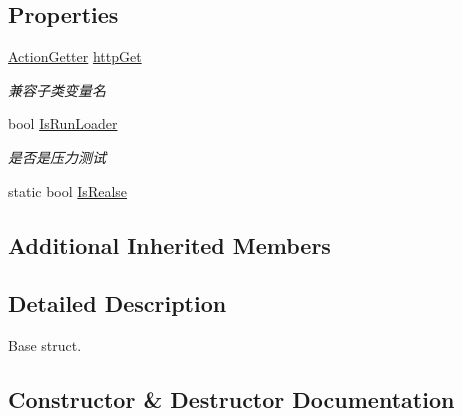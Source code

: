 \subsection*{Properties}
\begin{DoxyCompactItemize}
\item 
\mbox{\hyperlink{class_t_net_1_1_service_1_1_action_getter}{Action\+Getter}} \mbox{\hyperlink{class_t_net_1_1_service_1_1_base_struct_a04c1171f14d9ee44612f9966a8d61d30}{http\+Get}}
\begin{DoxyCompactList}\small\item\em 兼容子类变量名 \end{DoxyCompactList}\item 
bool \mbox{\hyperlink{class_t_net_1_1_service_1_1_base_struct_abd5492b1808c5a9ab507efd9dbec0540}{Is\+Run\+Loader}}
\begin{DoxyCompactList}\small\item\em 是否是压力测试 \end{DoxyCompactList}\item 
static bool \mbox{\hyperlink{class_t_net_1_1_service_1_1_base_struct_adfb097298fcd97ee77da130c5f40c2b3}{Is\+Realse}}
\end{DoxyCompactItemize}
\subsection*{Additional Inherited Members}


\subsection{Detailed Description}
Base struct. 



\subsection{Constructor \& Destructor Documentation}
\mbox{\label{class_t_net_1_1_service_1_1_base_struct_a7d2af70a22df08f708c9707a205f1161}} 
